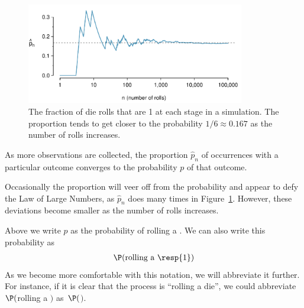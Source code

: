 	\begin{figure}%
		\centering
		\includegraphics[width=0.85\textwidth]{ch_probability/figures/dieProp/dieProp}
		\caption{The fraction of die rolls that are 1 at each stage in a simulation.
		The proportion tends to get closer to the probability $1/6 \approx 0.167$ as the number of rolls increases.}
		\label{dieProp}
	\end{figure}

	\begin{termBox}{
	As more observations are collected, the proportion $\hat{p}_n$ of occurrences with a particular outcome converges to the probability $p$ of that outcome.}
	\end{termBox}

	Occasionally the proportion will veer off from the probability and appear to defy the Law of Large Numbers, as $\hat{p}_n$ does many times in Figure~\ref{dieProp}. However, these deviations become smaller as the number of rolls increases.

	Above we write $p$ as the probability of rolling a . We can also write this probability as
	\begin{eqnarray*}
	\P(\text{rolling a \resp{1}})
	\end{eqnarray*}
	As we become more comfortable with this notation, we will abbreviate it further. For instance, if it is clear that the process is ``rolling a die'', we could abbreviate $\P($rolling a $)$ as~$\P($$)$. 


